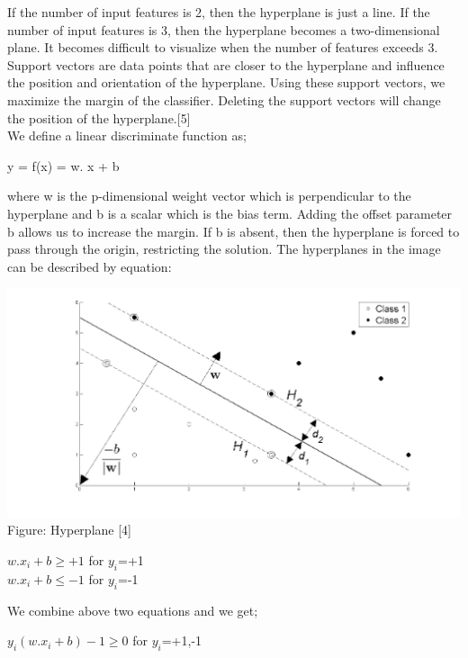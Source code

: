 \documentclass[hidelinks,11pt]{article}
\begin{document}
	If the number of input features is 2, then the hyperplane is just a line. If the number of input features is 3, then the hyperplane becomes a two-dimensional plane. It becomes difficult to visualize when the number of features exceeds 3.
	Support vectors are data points that are closer to the hyperplane and influence the position and orientation of the hyperplane. Using these support vectors, we maximize the margin of the classifier. Deleting the support vectors will change the position of the hyperplane.[5]
	\\

	We define a linear discriminate function as;
	\begin{center}
	y = f(x) = w. x + b     
	\end{center}
	where w is the p-dimensional weight vector which is perpendicular to the hyperplane and b is a scalar which is the bias term.  Adding the offset parameter b allows us to increase the margin. If b is absent, then
	the hyperplane is forced to pass through the origin, restricting the solution. 
	The hyperplanes in the image can be described by equation: 
	\begin{center}
	    \includegraphics[scale = 0.7]{images/svm.png}
	    Figure: Hyperplane [4]
	\end{center}
	\begin{center}
	$w.x_i + b \geq +1$  for $y_i$=+1\\
	$w.x_i + b \leq -1 $ for $y_i$=-1    
	\end{center}
	We combine above two equations and we get;
	\begin{center}
	$y_i(w.x_i + b)-1 \geq 0$  for $y_i$=+1,-1\\
	\end{center}
\end{document}
